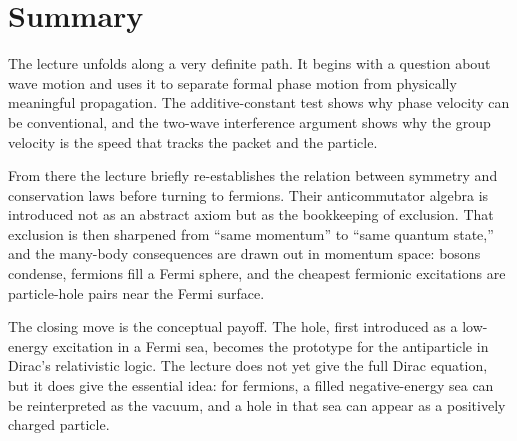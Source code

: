 \section{Summary}

The lecture unfolds along a very definite path. It begins with a question about wave motion and uses it to separate formal phase motion from physically meaningful propagation. The additive-constant test shows why phase velocity can be conventional, and the two-wave interference argument shows why the group velocity is the speed that tracks the packet and the particle.

From there the lecture briefly re-establishes the relation between symmetry and conservation laws before turning to fermions. Their anticommutator algebra is introduced not as an abstract axiom but as the bookkeeping of exclusion. That exclusion is then sharpened from ``same momentum'' to ``same quantum state,'' and the many-body consequences are drawn out in momentum space: bosons condense, fermions fill a Fermi sphere, and the cheapest fermionic excitations are particle-hole pairs near the Fermi surface.

The closing move is the conceptual payoff. The hole, first introduced as a low-energy excitation in a Fermi sea, becomes the prototype for the antiparticle in Dirac's relativistic logic. The lecture does not yet give the full Dirac equation, but it does give the essential idea: for fermions, a filled negative-energy sea can be reinterpreted as the vacuum, and a hole in that sea can appear as a positively charged particle.